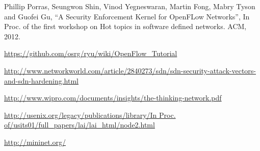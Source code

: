 \begin{thebibliography}{1}
Phillip Porras, Seungwon Shin, Vinod Yegneswaran, Martin Fong, Mabry Tyson and Guofei Gu,
``A Security Enforcement Kernel for OpenFLow Networks'', In Proc. of the first workshop on Hot topics in software defined networks. ACM, 2012.


\url{https://github.com/osrg/ryu/wiki/OpenFlow_Tutorial}

\url{http://www.networkworld.com/article/2840273/sdn/sdn-security-attack-vectors-and-sdn-hardening.html}

\url{http://www.wipro.com/documents/insights/the-thinking-network.pdf}

\url{http://usenix.org/legacy/publications/library/In Proc. of/usits01/full_papers/lai/lai_html/node2.html}

\url{http://mininet.org/}

\end{thebibliography}